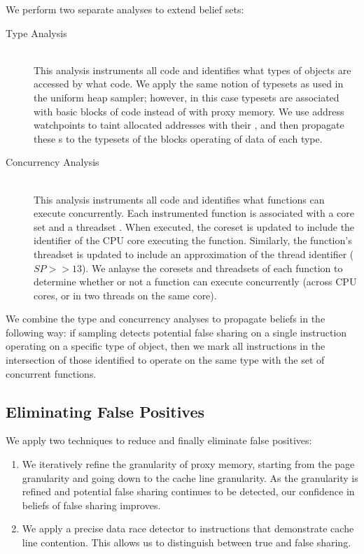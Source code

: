 \documentclass{sig-alternate}
\begin{document}
We perform two separate analyses to extend belief sets: \begin{description}
\item[Type Analysis] \hfill \\
This analysis instruments all code and identifies what types of objects are accessed by what code. We apply the same
notion of typesets as used in the uniform heap sampler; however, in this case typesets are associated with basic
blocks of code instead of with proxy memory. We use address watchpoints \cite{AddressWatchpoints} to taint
allocated addresses with their \TypeId{}, and then propagate these \TypeId{}s to the typesets of the blocks operating
of data of each type.

\item[Concurrency Analysis] \hfill \\
This analysis instruments all code and identifies what functions can execute concurrently. Each instrumented function
is associated with a core set and a threadset \cite{DrContention}. When executed, the coreset is updated to include the
identifier of the CPU core executing the function. Similarly, the function's threadset is updated to include an approximation
of the thread identifier ($SP >> 13$). We anlayse the coresets and threadsets of each function to determine whether or
not a function can execute concurrently (across CPU cores, or in two threads on the same core).

\end{description}

We combine the type and concurrency analyses to propagate beliefs in the following way: if sampling detects potential
false sharing on a single instruction operating on a specific type of object, then we mark all instructions in the intersection
of those identified to operate on the same type with the set of concurrent functions.

\subsection{Eliminating False Positives}\label{sec:falsepos}

We apply two techniques to reduce and finally eliminate false positives:
\begin{enumerate}
\item We iteratively refine the granularity of proxy memory, starting from the page granularity and going down to the cache
line granularity. As the granularity is refined and potential false sharing continues to be detected, our confidence in beliefs
of false sharing improves.

\item We apply a precise data race detector \cite{DataCollider} to instructions that demonstrate cache line contention. This
allows us to distinguish between true and false sharing.
\end{enumerate}
\end{document}

